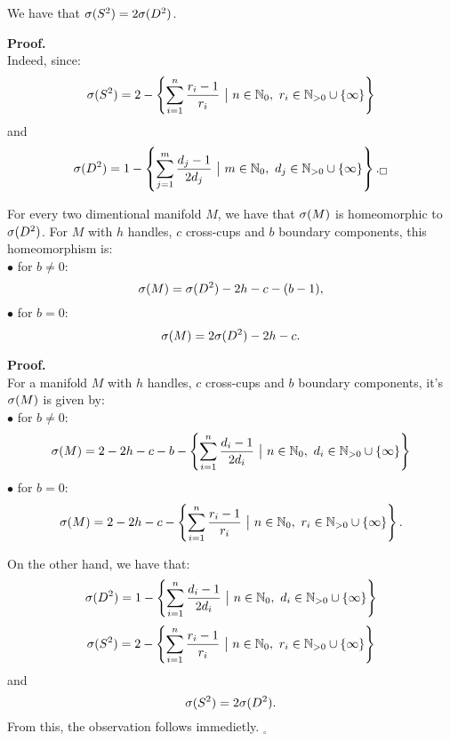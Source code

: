 \begin{observation}\label{2times homeomorphism}
We have that ${{\sigma}(S^2)} = 2{{\sigma}(D^2)}$.
\end{observation}
\textbf{Proof.}\\

Indeed, since: 
\begin{align}
\spe(S^2) = 2 -\left\{\sum\limits_{i=1}^n \frac{r_i-1}{r_i}\ \big|\ n\in\mathbb{N}_0,\ 
r_i\in\mathbb{N}_{>0}\cup \{\infty\}\right\}
\end{align}
and 
\begin{align}
\spe(D^2) = 1 - \left\{\sum\limits_{j=1}^m\frac{d_j-1}{2d_j}\ 
\big|\ m\in\mathbb{N}_0,\ d_j\in\mathbb{N}_{>0}\cup \{\infty\}\right\}._\square
\end{align}

\begin{observation}\label{all_spectra_are_isomorphic}\label{spe_M}
For every two dimentional manifold $M$, we have that ${\sigma}(M)$ is homeomorphic to ${{\sigma}(D^2)}$. 
For $M$ with $h$ handles, $c$ cross-cups and $b$ boundary components, this homeomorphism is: \\
$\bullet$ for $b \neq 0$:
\begin{equation}
{\sigma}(M) = {{\sigma}(D^2)} - 2h - c - (b - 1), 
\end{equation}
$\bullet$ for $b = 0$:
\begin{equation}
{\sigma}(M) = 2{{\sigma}(D^2)} - 2h - c.
\end{equation}  
\end{observation}

\textbf{Proof.} \\
For a manifold $M$ with $h$ handles, $c$ cross-cups and $b$ boundary components, it's 
${{\sigma}(M)}$ is given by:\\
$\bullet$ for $b\neq 0$: 
\begin{equation}
\spe(M) = 2-2h-c-b - \left\{\sum\limits_{i=1}^n\frac{d_i-1}{2d_i}\ 
\big|\ n\in\mathbb{N}_0,\ d_i\in\mathbb{N}_{>0}\cup \{\infty\}\right\}
\end{equation}
$\bullet$ for $b = 0$:
\begin{equation}
\spe(M) = 2-2h-c - \left\{\sum\limits_{i=1}^n \frac{r_i-1}{r_i}\ \big|\ n\in\mathbb{N}_0,\ 
r_i\in\mathbb{N}_{>0}\cup \{\infty\}\right\}.
\end{equation} 

On the other hand, we have that:
\begin{equation}
\speD = 1-\left\{\sum\limits_{i=1}^n\frac{d_i-1}{2d_i}\ 
\big|\ n\in\mathbb{N}_0,\ d_i\in\mathbb{N}_{>0}\cup \{\infty\}\right\}
\end{equation}
\begin{equation}
\speS = 2 - \left\{\sum\limits_{i=1}^n \frac{r_i-1}{r_i}\ \big|\ n\in\mathbb{N}_0,\ 
r_i\in\mathbb{N}_{>0}\cup \{\infty\}\right\}
\end{equation}
and
\begin{equation}
{{\sigma}(S^2)} = 2{{\sigma}(D^2)}.
\end{equation}
From this, the observation follows immedietly. $_\square$


